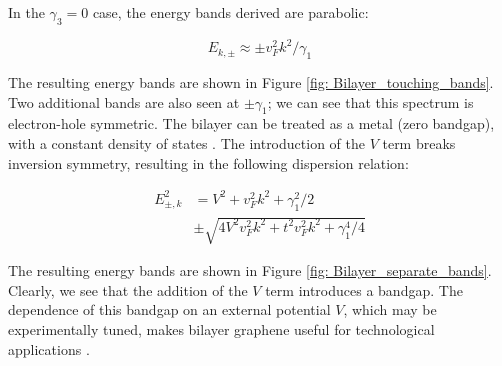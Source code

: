 \documentclass[]{article}
\begin{document}
In the $\gamma_3 = 0$ case, the energy bands derived are parabolic:

\begin{equation}
	E_{k, \pm} \approx \pm v_F^2 k^2 / \gamma_1
\end{equation}

The resulting energy bands are shown in Figure \ref{fig: Bilayer_touching_bands}. Two additional bands are also seen at $\pm \gamma_1$; we can see that this spectrum is electron-hole symmetric. The bilayer can be treated as a metal (zero bandgap), with a constant density of states \cite{The_Electronic_Properties_of_Graphene}. The introduction of the $V$ term breaks inversion symmetry, resulting in the following dispersion relation:

\begin{align}
	E_{\pm, k}^2 &= V^2 + v_F^2 k^2 + \gamma_1^2/2\\
	&\pm \sqrt{4V^2 v_F^2 k^2 + t^2 v_F^2 k^2 + \gamma_1^4/4}
\end{align}

The resulting energy bands are shown in Figure \ref{fig: Bilayer_separate_bands}. Clearly, we see that the addition of the $V$ term introduces a bandgap. The dependence of this bandgap on an external potential $V$, which may be experimentally tuned, makes bilayer graphene useful for technological applications \cite{The_Electronic_Properties_of_Graphene}.
\end{document}
